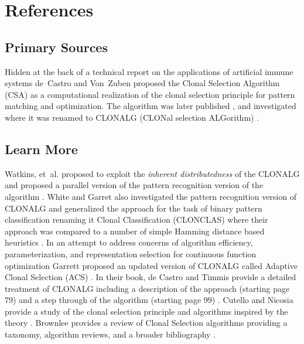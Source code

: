 \documentclass[a4paper, 11pt]{article}
\begin{document}



\section{References}
\label{sec:references}

% 
% 
\subsection{Primary Sources}
Hidden at the back of a technical report on the applications of artificial immune systems de~Castro and Von~Zuben \cite{Castro1999} proposed the Clonal Selection Algorithm (CSA) as a computational realization of the clonal selection principle for pattern matching and optimization.
The algorithm was later published \cite{Castro2000}, and investigated where it was renamed to CLONALG (CLONal selection ALGorithm) \cite{Castro2002a}.

% 
% 
\subsection{Learn More}
Watkins, et~al. proposed to exploit the \emph{inherent distributedness} of the CLONALG and proposed a parallel version of the pattern recognition version of the algorithm \cite{Watkins2003}.
White and Garret also investigated the pattern recognition version of CLONALG and generalized the approach for the task of binary pattern classification renaming it Clonal Classification (CLONCLAS) where their approach was compared to a number of simple Hamming distance based heuristics \cite{White2003}.
In an attempt to address concerns of algorithm efficiency, parameterization, and representation selection for continuous function optimization Garrett proposed an updated version of CLONALG called Adaptive Clonal Selection (ACS) \cite{Garrett2004}.
In their book, de Castro and Timmis provide a detailed treatment of CLONALG including a description of the approach (starting page 79) and a step through of the algorithm (starting page 99) \cite{Castro2002b}.
Cutello and Nicosia provide a study of the clonal selection principle and algorithms inspired by the theory \cite{Cutello2005}.
Brownlee provides a review of Clonal Selection algorithms providing a taxonomy, algorithm reviews, and a broader bibliography \cite{Brownlee2007b}. 
\end{document}
